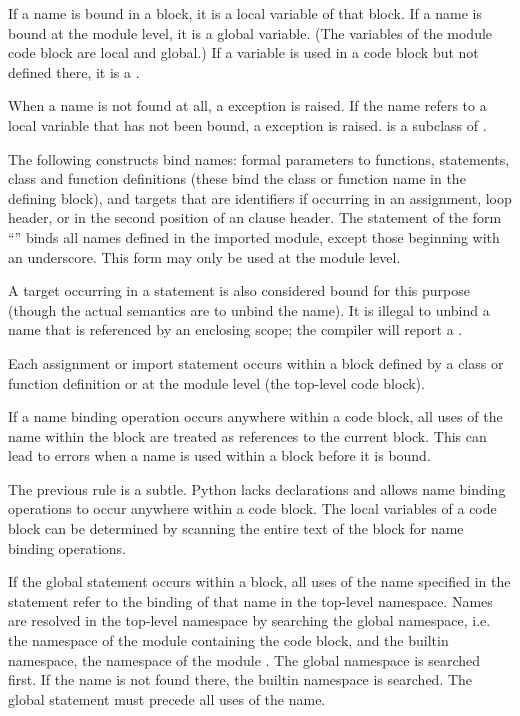 If a name is bound in a block, it is a local variable of that block.
If a name is bound at the module level, it is a global variable.  (The
variables of the module code block are local and global.)  If a
variable is used in a code block but not defined there, it is a
.

When a name is not found at all, a
 exception is raised.  If the name
refers to a local variable that has not been bound, a
 exception is
raised.   is a subclass of
.

The following constructs bind names: formal parameters to functions,
 statements, class and function definitions (these
bind the class or function name in the defining block), and targets
that are identifiers if occurring in an assignment,  loop
header, or in the second position of an  clause
header.  The  statement of the form ``'' binds all names defined in the
imported module, except those beginning with an underscore.  This form
may only be used at the module level.

A target occurring in a  statement is also considered bound
for this purpose (though the actual semantics are to unbind the
name).  It is illegal to unbind a name that is referenced by an
enclosing scope; the compiler will report a .

Each assignment or import statement occurs within a block defined by a
class or function definition or at the module level (the top-level
code block).

If a name binding operation occurs anywhere within a code block, all
uses of the name within the block are treated as references to the
current block.  This can lead to errors when a name is used within a
block before it is bound.

The previous rule is a subtle.  Python lacks declarations and allows
name binding operations to occur anywhere within a code block.  The
local variables of a code block can be determined by scanning the
entire text of the block for name binding operations.

If the global statement occurs within a block, all uses of the name
specified in the statement refer to the binding of that name in the
top-level namespace.  Names are resolved in the top-level namespace by
searching the global namespace, i.e. the namespace of the module
containing the code block, and the builtin namespace, the namespace of
the module .  The global namespace is searched
first.  If the name is not found there, the builtin namespace is
searched.  The global statement must precede all uses of the name.

